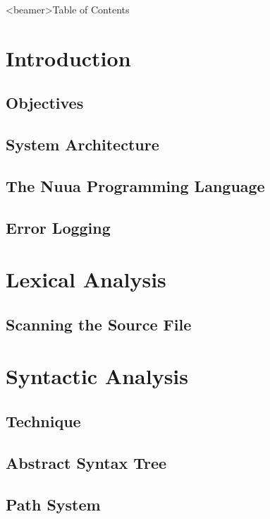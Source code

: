 



\frame{\titlepage}
\begin{frame}<beamer>{Table of Contents}
    \begin{small}
    \tableofcontents[
        subsectionstyle=hide,
    ]
    \end{small}
\end{frame}
\section{Introduction}
\subsection{Objectives}

\subsection{System Architecture}

\subsection{The Nuua Programming Language}

\subsection{Error Logging}

\section{Lexical Analysis}
\subsection{Scanning the Source File}

\section{Syntactic Analysis}
\subsection{Technique}

\subsection{Abstract Syntax Tree}

\subsection{Path System}

